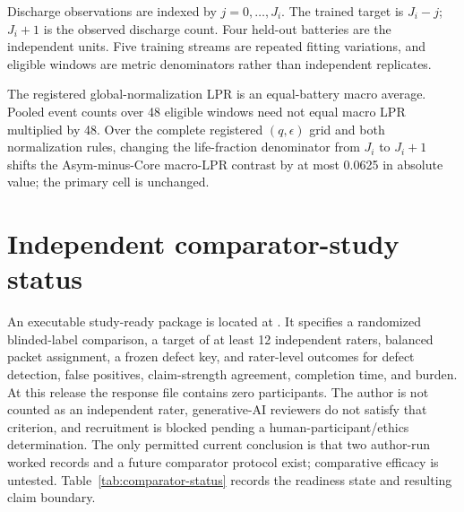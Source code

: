 \documentclass[11pt,a4paper]{article}
\begin{document}
Discharge observations are indexed by $j=0,\ldots,J_i$. The trained target is $J_i-j$; $J_i+1$ is the observed discharge count. Four held-out batteries are the independent units. Five training streams are repeated fitting variations, and eligible windows are metric denominators rather than independent replicates.






The registered global-normalization LPR is an equal-battery macro average. Pooled event counts over 48 eligible windows need not equal macro LPR multiplied by 48. Over the complete registered $(q,\epsilon)$ grid and both normalization rules, changing the life-fraction denominator from $J_i$ to $J_i+1$ shifts the Asym-minus-Core macro-LPR contrast by at most 0.0625 in absolute value; the primary cell is unchanged.

\section{Independent comparator-study status}

An executable study-ready package is located at . It specifies a randomized blinded-label comparison, a target of at least 12 independent raters, balanced packet assignment, a frozen defect key, and rater-level outcomes for defect detection, false positives, claim-strength agreement, completion time, and burden. At this release the response file contains zero participants. The author is not counted as an independent rater, generative-AI reviewers do not satisfy that criterion, and recruitment is blocked pending a human-participant/ethics determination. The only permitted current conclusion is that two author-run worked records and a future comparator protocol exist; comparative efficacy is untested. Table~\ref{tab:comparator-status} records the readiness state and resulting claim boundary.
\end{document}
